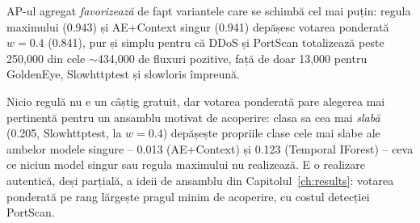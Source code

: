 AP-ul agregat \emph{favorizează} de fapt variantele care se schimbă cel mai puțin: regula maximului (0.943) și AE+Context singur (0.941) depășesc votarea ponderată $w=0.4$ (0.841), pur și simplu pentru că DDoS și PortScan totalizează peste 250{,}000 din cele $\sim$434{,}000 de fluxuri pozitive, față de doar 13{,}000 pentru GoldenEye, Slowhttptest și slowloris împreună.

Nicio regulă nu e un câștig gratuit, dar votarea ponderată pare alegerea mai pertinentă pentru un ansamblu motivat de acoperire: clasa sa cea mai \emph{slabă} (0.205, Slowhttptest, la $w=0.4$) depășește propriile clase cele mai slabe ale ambelor modele singure -- 0.013 (AE+Context) și 0.123 (Temporal IForest) -- ceva ce niciun model singur sau regula maximului nu realizează. E o realizare autentică, deși parțială, a ideii de ansamblu din Capitolul~\ref{ch:results}: votarea ponderată pe rang lărgește pragul minim de acoperire, cu costul detecției PortScan.

